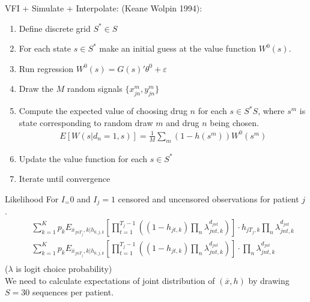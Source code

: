 \documentclass[xcolor=pdftex,dvipsnames,table,mathserif,aspectratio=169]{beamer}
\begin{document}
\begin{frame}{VFI + Simulate + Interpolate: (Keane Wolpin 1994): }
\begin{enumerate}
\item Define discrete grid $S^* \in S$
\item For each state $s \in S^*$ make an initial guess at the value function $W^0(s)$.
\item Run regression $W^0(s) = G(s)'\theta^0 + \varepsilon$
\item Draw the $M$ random signals $\{x_{jn}^m, y_{jn}^m\}$
\item Compute the expected value of choosing drug $n$ for each $s \in S^*S$, where $s^m$ is state corresponding to random draw $m$ and drug $n$ being chosen.
\begin{eqnarray*}
E[W(s | d_n =1,s)] = \frac{1}{M} \sum_m (1-h(s^m)) W^0(s^m)
\end{eqnarray*}
\item Update the value function for each $s \in S^{*}$
\item Iterate until convergence
\end{enumerate}
\end{frame}

\begin{frame}{Likelihood}
For $I_=0$ and $I_j=1$ censored and uncensored observations for patient $j$.
\begin{eqnarray*}
&&\sum_{k=1}^K p_k E_{\overline{x}_{jn T_{j}},k | h_{0,j,k}} \left[ \prod_{t=1}^{T_j-1} \left((1-h_{jt,k}) \prod_n \lambda_{jnt,k}^{d_{jnt}} \right) \right] \cdot h_{jT_j,k} \prod_n  \lambda_{jnt,k}^{d_{jnt}}\\
&&\sum_{k=1}^K p_k E_{\overline{x}_{jn T_{j}},k | h_{0,j,k}} \left[ \prod_{t=1}^{T_j-1} \left((1-h_{jt,k}) \prod_n \lambda_{jnt,k}^{d_{jnt}} \right) \right] \cdot \prod_n  \lambda_{jnt,k}^{d_{jnt}}\\
\end{eqnarray*}
($\lambda$ is logit choice probability)\\
We need to calculate expectations of joint distribution of $(\overline{x},h)$ by drawing $S=30$ sequences  per patient.
\end{frame}

\end{document}
